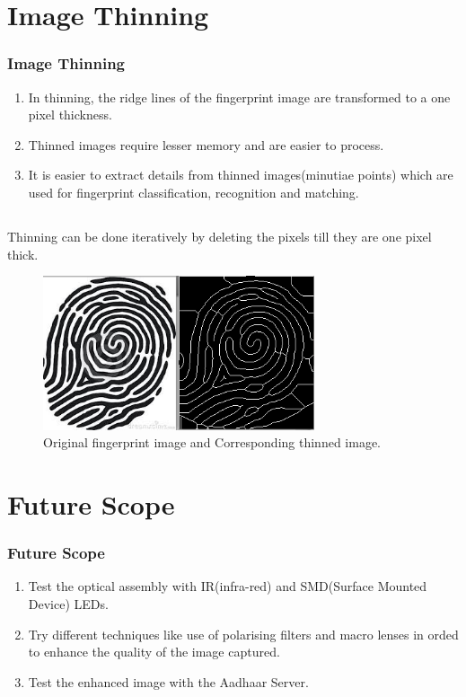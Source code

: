 \documentclass[12pt]{beamer}
\begin{document}
\section{Image Thinning}
\begin{frame}[c]
\frametitle{Image Thinning}
\begin{enumerate}
\item \vskip-30pt In thinning, the ridge lines of the fingerprint image are transformed to a one pixel thickness.
\item Thinned images require lesser memory and are easier to process. 
\item It is easier to extract details from thinned images(minutiae points) which are used for fingerprint classification, recognition and matching. 
\end{enumerate}
\end{frame}

\subsection{}
\begin{frame}[c]
\frametitle{}
Thinning can be done iteratively by deleting the pixels till they are one pixel thick.\\
\begin{figure}
 \centering
 \includegraphics[width=8cm]{./thin.jpg}
 \caption{Original fingerprint image and Corresponding thinned image. }
\end{figure}
\end{frame}



\section{Future Scope}
\begin{frame}[c]
\frametitle{Future Scope}
\begin{enumerate}
\item \vskip-30pt Test the optical assembly with IR(infra-red) and SMD(Surface Mounted Device) LEDs.
\item Try different techniques like use of polarising filters and macro lenses in orded to enhance the quality of the image captured.
\item Test the enhanced image with the Aadhaar Server.
\end{enumerate}
\end{frame}
\end{document}
